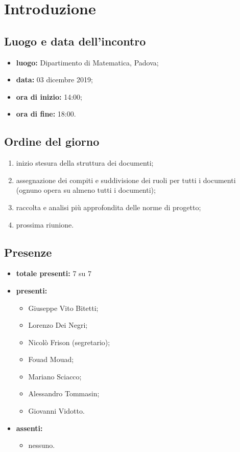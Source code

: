 \section*{Introduzione}

\subsection*{Luogo e data dell'incontro}
	\begin{itemize}
		\item \textbf{luogo:} Dipartimento di Matematica, Padova;
		\item \textbf{data:} 03 dicembre 2019;
		\item \textbf{ora di inizio:} 14:00;
		\item \textbf{ora di fine:} 18:00.
	\end{itemize}

\subsection*{Ordine del giorno}
	\begin{enumerate}
		\item inizio stesura della struttura dei documenti;
		\item assegnazione dei compiti e suddivisione dei ruoli per tutti i documenti (ognuno opera su almeno tutti i documenti);
		\item raccolta e analisi più approfondita delle norme di progetto;
		\item prossima riunione.

	\end{enumerate}

\subsection*{Presenze}
	\begin{itemize}
		\item \textbf{totale presenti:} 7 su 7
		\item \textbf{presenti: }
			\begin{itemize}
				\item Giuseppe Vito Bitetti;
				\item Lorenzo Dei Negri;
				\item Nicolò Frison (segretario);
				\item Fouad Mouad;
				\item Mariano Sciacco;
				\item Alessandro Tommasin;
				\item Giovanni Vidotto.
			\end{itemize}
		\item \textbf{assenti: }
    \begin{itemize}
			\item nessuno.
		\end{itemize}

	\end{itemize}


